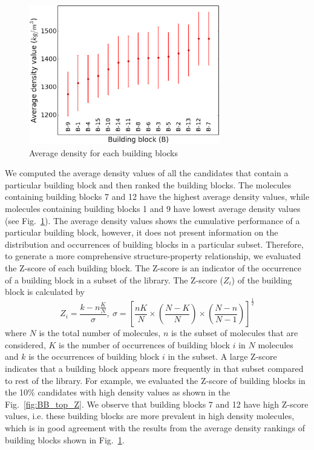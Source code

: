 \begin{figure}[htbp] 
	\centering
	\includegraphics[width=0.744\textwidth]{Chapter-6/Figures/BB_avg_den.eps}
	\caption{Average density for each building blocks}
	\label{fig:bb_avden} 
\end{figure} 

We computed the average density values of all the candidates that contain a particular building block and then ranked the building blocks. The molecules containing building blocks 7 and 12 have the highest average density values, while molecules containing building blocks 1 and 9 have lowest average density values (see Fig.\ \ref{fig:bb_avden}). The average density values shows the cumulative performance of a particular building block, however, it does not present information on the distribution and occurrences of building blocks in a particular subset. Therefore, to generate a more comprehensive structure-property relationship, we evaluated the Z-score of each building block. The Z-score is an indicator of the occurrence of a building block in a subset of the library. The Z-score ($Z_i$) of the building block is calculated by
\[
Z_i=\frac{k-n\frac{K}{N} }{\sigma},\ \sigma=\left [ \frac{nK}{N}\times \left ( \frac{N-K}{N} \right )\times \left ( \frac{N-n}{N-1} \right )\right ]^{\frac{1}{2}}
\]
where $N$ is the total number of molecules, $n$ is the subset of molecules that are considered, $K$ is the number of occurrences of building block $i$ in $N$ molecules and $k$ is the occurrences of building block $i$ in the subset. A large Z-score indicates that a building block appears more frequently in that subset compared to rest of the library. For example, we evaluated the Z-score of building blocks in the 10\% candidates with high density values as shown in the Fig.\ \ref{fig:BB_top_Z}. We observe that building blocks 7 and 12 have high Z-score values, i.e. these building blocks are more prevalent in high density molecules, which is in good agreement with the results from the average density rankings of building blocks shown in Fig.\ \ref{fig:bb_avden}.  

